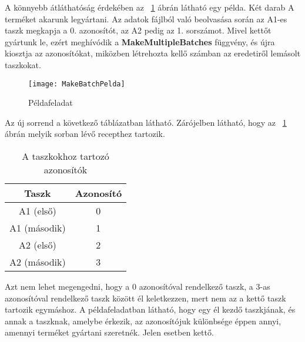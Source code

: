 A könnyebb átláthatóság érdekében az ~\ref{MakeBatchPelda} ábrán látható egy példa. Két darab A terméket akarunk legyártani. Az adatok fájlból való beolvasása során az A1-es taszk megkapja a 0. azonosítót, az A2 pedig az 1. sorszámot. Mivel kettőt gyártunk le, ezért meghívódik a \textbf{MakeMultipleBatches} függvény, és újra kiosztja az azonosítókat, miközben létrehozta kellő számban az eredetiről lemásolt taszkokat. 
\begin{figure}[H]
\begin{center}
\texttt{[image: MakeBatchPelda]}
\caption{Példafeladat}
\label{MakeBatchPelda}
\end{center}
\end{figure}
Az új sorrend a következő táblázatban látható. Zárójelben látható, hogy az ~\ref{MakeBatchPelda} ábrán melyik sorban lévő recepthez tartozik.
\begin{table}[H]
  \begin{center}
  	\caption{A taszkokhoz tartozó azonosítók}
  	\captionsetup[table]{skip=10pt}
    \label{tab:table1}
    \begin{tabular}{|c|c|}
      \textbf{Taszk} & \textbf{Azonosító} \\     
      \hline
      A1 (első) & 0\\
      A1 (második) & 1\\
      A2 (első) & 2\\
      A2 (második) & 3\\
    \end{tabular}
  \end{center}
\end{table}
Azt nem lehet megengedni, hogy a 0 azonosítóval rendelkező taszk, a 3-as azonosítóval rendelkező taszk között él keletkezzen, mert nem az a kettő taszk tartozik egymáshoz. A példafeladatban látható, hogy egy él kezdő taszkjának, és annak a taszknak, amelybe érkezik, az azonosítójuk különbsége éppen annyi, amennyi terméket gyártani szeretnék. Jelen esetben kettő. 

